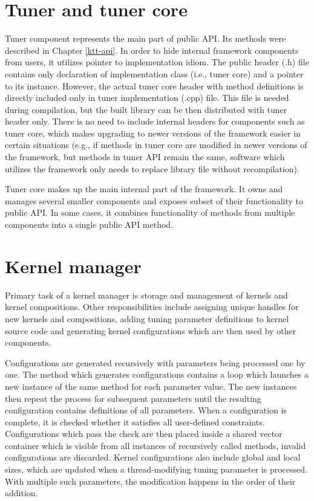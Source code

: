 \documentclass
[
    digital, %
    oneside, %
    table, %
    nolof, %
    nolot, %
    nocover %
]{fithesis3}
\begin{document}
\section{Tuner and tuner core}
Tuner component represents the main part of public API. Its methods were described in Chapter \ref{ktt-api}. In order to hide internal framework
components from users, it utilizes pointer to implementation idiom. The public header (.h) file contains only declaration of implementation class
(i.e., tuner core) and a pointer to its instance. However, the actual tuner core header with method definitions is directly included only in tuner
implementation (.cpp) file. This file is needed during compilation, but the built library can be then distributed with tuner header only. There is
no need to include internal headers for components such as tuner core, which makes upgrading to newer versions of the framework easier in certain situations
(e.g., if methods in tuner core are modified in newer versions of the framework, but methods in tuner API remain the same, software which utilizes the
framework only needs to replace library file without recompilation).

Tuner core makes up the main internal part of the framework. It owns and manages several smaller components and exposes subset of their functionality
to public API. In some cases, it combines functionality of methods from multiple components into a single public API method.

\section{Kernel manager}
Primary task of a kernel manager is storage and management of kernels and kernel compositions. Other responsibilities include assigning unique handles for
new kernels and compositions, adding tuning parameter definitions to kernel source code and generating kernel configurations which are then used by other
components.

Configurations are generated recursively with parameters being processed one by one. The method which generates configurations contains a loop which
launches a new instance of the same method for each parameter value. The new instances then repeat the process for subsequent parameters until the
resulting configuration contains definitions of all parameters. When a configuration is complete, it is checked whether it satisfies all user-defined
constraints. Configurations which pass the check are then placed inside a shared vector container which is visible from all instances of recursively
called methods, invalid configurations are discarded. Kernel configurations also include global and local sizes, which are updated when a thread-modifying
tuning parameter is processed. With multiple such parameters, the modification happens in the order of their addition.
\end{document}
